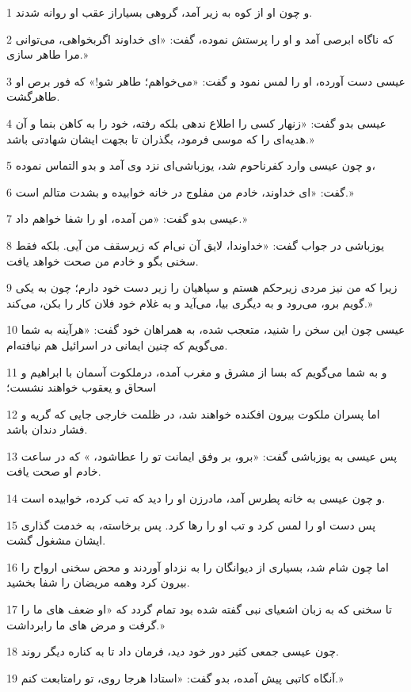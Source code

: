 \par 1 و چون او از کوه به زیر آمد، گروهی بسیاراز عقب او روانه شدند.
\par 2 که ناگاه ابرصی آمد و او را پرستش نموده، گفت: «ای خداوند اگربخواهی، می‌توانی مرا طاهر سازی.»
\par 3 عیسی دست آورده، او را لمس نمود و گفت: «می‌خواهم؛ طاهر شو!» که فور برص او طاهرگشت.
\par 4 عیسی بدو گفت: «زنهار کسی را اطلاع ندهی بلکه رفته، خود را به کاهن بنما و آن هدیه‌ای را که موسی فرمود، بگذران تا بجهت ایشان شهادتی باشد.»
\par 5 و چون عیسی وارد کفرناحوم شد، یوزباشی‌ای نزد وی آمد و بدو التماس نموده،
\par 6 گفت: «ای خداوند، خادم من مفلوج در خانه خوابیده و بشدت متالم است.»
\par 7 عیسی بدو گفت: «من آمده، او را شفا خواهم داد.»
\par 8 یوزباشی در جواب گفت: «خداوندا، لایق آن نی‌ام که زیرسقف من آیی. بلکه فقط سخنی بگو و خادم من صحت خواهد یافت.
\par 9 زیرا که من نیز مردی زیرحکم هستم و سپاهیان را زیر دست خود دارم؛ چون به یکی گویم برو، می‌رود و به دیگری بیا، می‌آید و به غلام خود فلان کار را بکن، می‌کند.»
\par 10 عیسی چون این سخن را شنید، متعجب شده، به همراهان خود گفت: «هرآینه به شما می‌گویم که چنین ایمانی در اسرائیل هم نیافته‌ام.
\par 11 و به شما می‌گویم که بسا از مشرق و مغرب آمده، درملکوت آسمان با ابراهیم و اسحاق و یعقوب خواهند نشست؛
\par 12 اما پسران ملکوت بیرون افکنده خواهند شد، در ظلمت خارجی جایی که گریه و فشار دندان باشد.
\par 13 پس عیسی به یوزباشی گفت: «برو، بر وفق ایمانت تو را عطاشود، » که در ساعت خادم او صحت یافت.
\par 14 و چون عیسی به خانه پطرس آمد، مادر‌زن او را دید که تب کرده، خوابیده است.
\par 15 پس دست او را لمس کرد و تب او را رها کرد. پس برخاسته، به خدمت گذاری ایشان مشغول گشت.
\par 16 اما چون شام شد، بسیاری از دیوانگان را به نزداو آوردند و محض سخنی ارواح را بیرون کرد وهمه مریضان را شفا بخشید.
\par 17 تا سخنی که به زبان اشعیای نبی گفته شده بود تمام گردد که «او ضعف های ما را گرفت و مرض های ما رابرداشت.»
\par 18 چون عیسی جمعی کثیر دور خود دید، فرمان داد تا به کناره دیگر روند.
\par 19 آنگاه کاتبی پیش آمده، بدو گفت: «استادا هرجا روی، تو رامتابعت کنم.»
